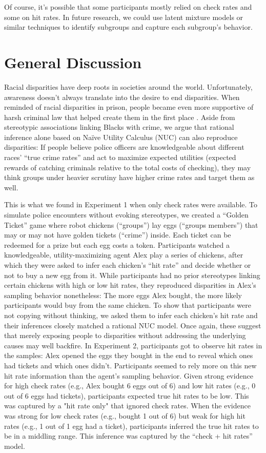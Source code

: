 \documentclass[10pt,letterpaper]{article}
\begin{document}
Of course, it's possible that some participants mostly relied on check rates and some on hit rates. In future research, we could use latent mixture models or similar techniques to identify subgroups and capture each subgroup's behavior.

\section{General Discussion}
Racial disparities have deep roots in societies around the world. Unfortunately, awareness doesn't always translate into the desire to end disparities. When reminded of racial disparities in prison, people became even more supportive of harsh criminal law that helped create them in the first place \citep[e.g.,][]{hetey2014racial,hetey2018numbers}. Aside from stereotypic associations linking Blacks with crime, we argue that rational inference alone based on Na\"ive Utility Calculus (NUC) \citep{jara2016naive} can also reproduce disparities: If people believe police officers are knowledgeable about different races' ``true crime rates'' and act to maximize expected utilities (expected rewards of catching criminals relative to the total costs of checking), they may think groups under heavier scrutiny have higher crime rates and target them as well. 

This is what we found in Experiment 1 when only check rates were available. To simulate police encounters without evoking stereotypes, we created a ``Golden Ticket'' game where robot chickens (``groups'') lay eggs (``groups members'') that may or may not have golden tickets (``crime'') inside. Each ticket can be redeemed for a prize but each egg costs a token. Participants watched a knowledgeable, utility-maximizing agent Alex play a series of chickens, after which they were asked to infer each chicken's ``hit rate'' and decide whether or not to buy a new egg from it. While participants had no prior stereotypes linking certain chickens with high or low hit rates, they reproduced disparities in Alex's sampling behavior nonetheless: The more eggs Alex bought, the more likely participants would buy from the same chicken. To show that participants were not copying without thinking, we asked them to infer each chicken's hit rate and their inferences closely matched a rational NUC model. Once again, these suggest that merely exposing people to disparities without addressing the underlying causes may well backfire. In Experiment 2, participants got to observe hit rates in the samples: Alex opened the eggs they bought in the end to reveal which ones had tickets and which ones didn't. Participants seemed to rely more on this new hit rate information than the agent's sampling behavior. Given strong evidence for high check rates (e.g., Alex bought 6 eggs out of 6) and low hit rates (e.g., 0 out of 6 eggs had tickets), participants expected true hit rates to be low. This was captured by a "hit rate only" that ignored check rates. When the evidence was strong for low check rates (e.g., bought 1 out of 6) but weak for high hit rates (e.g., 1 out of 1 egg had a ticket), participants inferred the true hit rates to be in a middling range. This inference was captured by the ``check + hit rates'' model.
\end{document}
